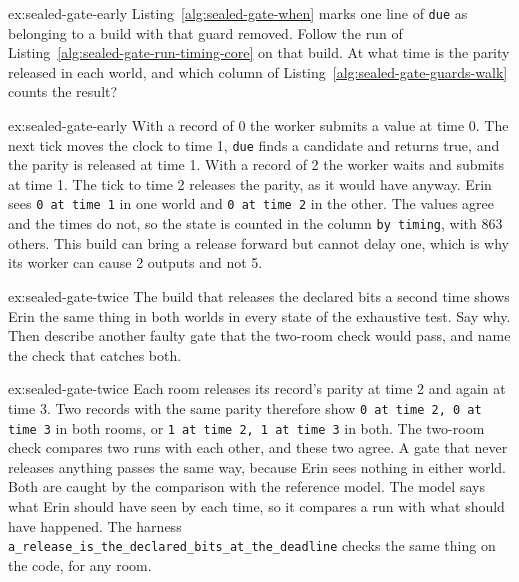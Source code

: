 \documentclass[11pt,a4paper]{article}
\theoremstyle{definition}
\begin{document}
\begin{pdexercise}[kind=Trace,rating=2]{ex:sealed-gate-early}
Listing~\ref{alg:sealed-gate-when} marks one line of \texttt{due} as
belonging to a build with that guard removed. Follow the run of
Listing~\ref{alg:sealed-gate-run-timing-core} on that build. At what time
is the parity released in each world, and which column of
Listing~\ref{alg:sealed-gate-guards-walk} counts the result?
\end{pdexercise}
\begin{pdsolution}{ex:sealed-gate-early}
With a record of 0 the worker submits a value at time 0. The next tick
moves the clock to time 1, \texttt{due} finds a candidate and returns
true, and the parity is released at time 1. With a record of 2 the worker
waits and submits at time 1. The tick to time 2 releases the parity, as it
would have anyway. Erin sees \texttt{0 at time 1} in one world and
\texttt{0 at time 2} in the other. The values agree and the times do not,
so the state is counted in the column \texttt{by timing}, with 863 others.
This build can bring a release forward but cannot delay one, which is why
its worker can cause 2 outputs and not 5.
\end{pdsolution}

\begin{pdexercise}[kind=Check,rating=2]{ex:sealed-gate-twice}
The build that releases the declared bits a second time shows Erin the
same thing in both worlds in every state of the exhaustive test. Say why.
Then describe another faulty gate that the two-room check would pass, and
name the check that catches both.
\end{pdexercise}
\begin{pdsolution}{ex:sealed-gate-twice}
Each room releases its record's parity at time 2 and again at time 3. Two
records with the same parity therefore show
\texttt{0 at time 2, 0 at time 3} in both rooms, or
\texttt{1 at time 2, 1 at time 3} in both. The two-room check compares two
runs with each other, and these two agree. A gate that never releases
anything passes the same way, because Erin sees nothing in either world.
Both are caught by the comparison with the reference model. The model says
what Erin should have seen by each time, so it compares a run with what
should have happened. The harness
\texttt{a\_release\_is\_the\_declared\_bits\_at\_the\_deadline} checks the
same thing on the code, for any room.
\end{pdsolution}
\end{document}
